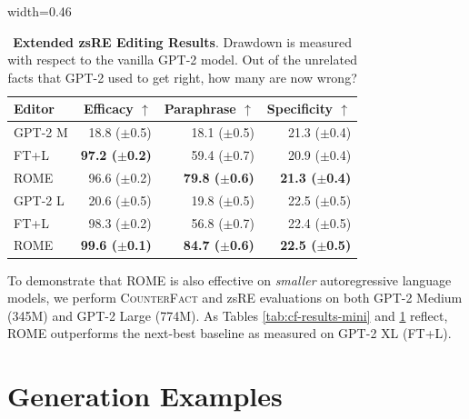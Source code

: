 \documentclass{article}
\newcommand{\goodmetric}[1]{{\color{ggreen} \textbf{#1}}}
\newcommand{\cfd}{\textsc{CounterFact}\xspace}
\newcommand{\method}{ROME\xspace}
\begin{document}
\begin{appendices}
\addtolength{\tabcolsep}{-1.5pt}


\begin{table}
    \centering
    \caption{\small \textbf{Extended zsRE Editing Results}. Drawdown is measured with respect to the vanilla GPT-2 model. Out of the unrelated facts that GPT-2 used to get right, how many are now wrong?}
    \label{tab:zsre-results-mini}
    \vspace{5pt}%
    \tiny
    \begin{adjustbox}{width=0.46\textwidth}
        \begin{tabular}{l r r r}
            \toprule
            \textbf{Editor} & \textbf{Efficacy} $\uparrow$ & \textbf{Paraphrase} $\uparrow$ & \textbf{Specificity} $\uparrow$ \\
            \midrule
GPT-2 M & 18.8 ($\pm$0.5) & 18.1 ($\pm$0.5) & 21.3 ($\pm$0.4)\\\midrule
FT+L & \goodmetric{97.2 ($\pm$0.2)} & 59.4 ($\pm$0.7) & 20.9 ($\pm$0.4)\\
ROME & 96.6 ($\pm$0.2) & \goodmetric{79.8 ($\pm$0.6)} & \goodmetric{21.3 ($\pm$0.4)}\\
\midrule\midrule
GPT-2 L & 20.6 ($\pm$0.5) & 19.8 ($\pm$0.5) & 22.5 ($\pm$0.5)\\\midrule
FT+L & 98.3 ($\pm$0.2) & 56.8 ($\pm$0.7) & 22.4 ($\pm$0.5)\\
ROME & \goodmetric{99.6 ($\pm$0.1)} & \goodmetric{84.7 ($\pm$0.6)} & \goodmetric{22.5 ($\pm$0.5)}\\
            \bottomrule
        \end{tabular}
    \end{adjustbox}
\end{table}


To demonstrate that \method is also effective on \textit{smaller} autoregressive language models, we perform \cfd and zsRE evaluations on both GPT-2 Medium (345M) and GPT-2 Large (774M). As Tables \ref{tab:cf-results-mini} and \ref{tab:zsre-results-mini} reflect, \method outperforms the next-best baseline as measured on GPT-2 XL (FT+L).


\section{Generation Examples} \label{apd:gen-samples}


\end{appendices}
\end{document}
